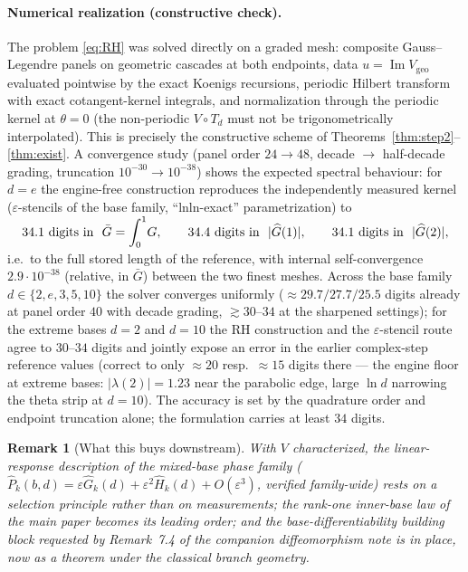 \documentclass[11pt]{article}
\newtheorem{remark}[theorem]{Remark}
\newcommand{\eps}{\varepsilon}
\begin{document}
\paragraph{Numerical realization (constructive check).}
The problem \eqref{eq:RH} was solved directly on a graded mesh: composite
Gauss--Legendre panels on geometric cascades at both endpoints, data
$u=\operatorname{Im}V_{\mathrm{geo}}$ evaluated pointwise by the exact
Koenigs recursions, periodic Hilbert transform with exact cotangent-kernel
integrals, and normalization through the periodic kernel at $\theta=0$
(the non-periodic $V\circ T_d$ must not be trigonometrically
interpolated).  This is precisely the constructive scheme of
Theorems~\ref{thm:step2}--\ref{thm:exist}.  A convergence study (panel
order $24\to48$, decade $\to$ half-decade grading, truncation
$10^{-30}\to10^{-38}$) shows the expected spectral behaviour: for $d=e$
the engine-free construction reproduces the independently measured kernel
($\eps$-stencils of the base family, ``lnln-exact'' parametrization) to
\[
  \text{$34.1$ digits in }\ \bar G=\smash{\int_0^1}G,\qquad
  \text{$34.4$ digits in }\ |\widehat G(1)|,\qquad
  \text{$34.1$ digits in }\ |\widehat G(2)|,
\]
i.e.\ to the full stored length of the reference, with internal
self-convergence $2.9\cdot10^{-38}$ (relative, in $\bar G$) between the
two finest meshes.  Across the base family $d\in\{2,e,3,5,10\}$ the
solver converges uniformly ($\approx29.7/27.7/25.5$ digits already at
panel order $40$ with decade grading, $\gtrsim30$--$34$ at the sharpened
settings); for the extreme bases $d=2$ and $d=10$ the RH construction
and the $\eps$-stencil route agree to $30$--$34$ digits and jointly
expose an error in the earlier complex-step reference values (correct to
only $\approx20$ resp.\ $\approx15$ digits there --- the engine floor at
extreme bases: $|\lambda(2)|=1.23$ near the parabolic edge, large
$\ln d$ narrowing the theta strip at $d=10$).  The accuracy is set by
the quadrature order and endpoint truncation alone; the formulation
carries at least $34$ digits.

\begin{remark}[What this buys downstream]
With $V$ characterized, the linear-response description of the mixed-base
phase family ($\widehat P_k(b,d)=\eps\widehat G_k(d)+\eps^2\widehat H_k(d)
+O(\eps^3)$, verified family-wide) rests on a selection principle rather
than on measurements; the rank-one inner-base law of the main paper
becomes its leading order; and the base-differentiability building block
requested by Remark~7.4 of the companion diffeomorphism note is in place,
now as a theorem under the classical branch geometry.
\end{remark}
\end{document}
